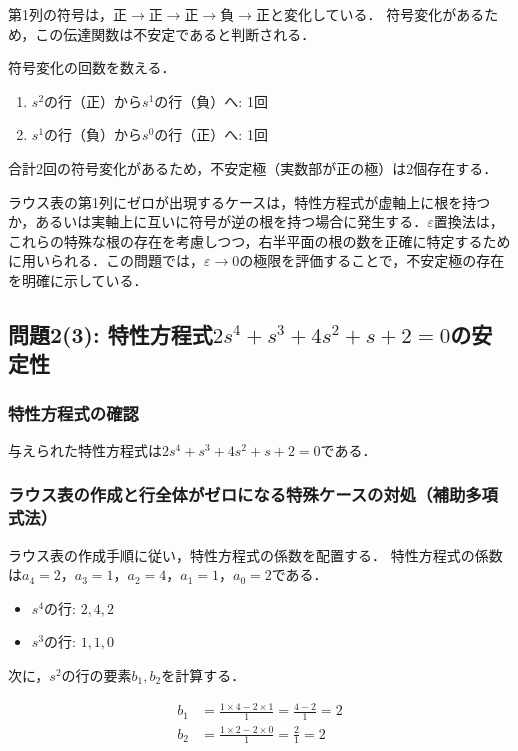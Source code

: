 \documentclass[11pt,a4paper]{ltjsarticle}
\begin{document}
第1列の符号は，正$\to$正$\to$正$\to$負$\to$正と変化している．
符号変化があるため，この伝達関数は不安定であると判断される．

符号変化の回数を数える．

\begin{enumerate}
\item $s^2$の行（正）から$s^1$の行（負）へ: 1回
\item $s^1$の行（負）から$s^0$の行（正）へ: 1回
\end{enumerate}

合計2回の符号変化があるため，不安定極（実数部が正の極）は2個存在する．

ラウス表の第1列にゼロが出現するケースは，特性方程式が虚軸上に根を持つか，あるいは実軸上に互いに符号が逆の根を持つ場合に発生する．$\varepsilon$置換法は，これらの特殊な根の存在を考慮しつつ，右半平面の根の数を正確に特定するために用いられる．この問題では，$\varepsilon \to 0$の極限を評価することで，不安定極の存在を明確に示している．

\subsection{\texorpdfstring{問題2(3): 特性方程式$2s^4+s^3+4s^2+s+2=0$の安定性}{問題2(3): 特性方程式の安定性}}

\subsubsection{特性方程式の確認}

与えられた特性方程式は$2s^4+s^3+4s^2+s+2=0$である．

\subsubsection{ラウス表の作成と行全体がゼロになる特殊ケースの対処（補助多項式法）}

ラウス表の作成手順に従い，特性方程式の係数を配置する．
特性方程式の係数は$a_4=2$，$a_3=1$，$a_2=4$，$a_1=1$，$a_0=2$である．

\begin{itemize}
\item $s^4$の行: $2, 4, 2$
\item $s^3$の行: $1, 1, 0$
\end{itemize}

次に，$s^2$の行の要素$b_1, b_2$を計算する．

\begin{align}
b_1 &= \frac{1 \times 4 - 2 \times 1}{1} = \frac{4-2}{1} = 2 \\
b_2 &= \frac{1 \times 2 - 2 \times 0}{1} = \frac{2}{1} = 2
\end{align}
\end{document}
